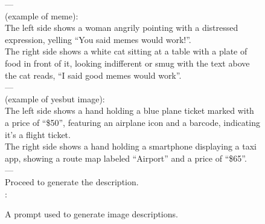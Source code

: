 \begin{figure*}[h]
\begin{tcolorbox}
---\\
\text{[Description]} (example of meme):\\
The left side shows a woman angrily pointing with a distressed expression, yelling ``You said memes would work!''.\\
The right side shows a white cat sitting at a table with a plate of food in front of it, looking indifferent or smug with the text above the cat reads, ``I said good memes would work''.\\
---\\
\text{[Description]} (example of yesbut image):\\
The left side shows a hand holding a blue plane ticket marked with a price of ``\$50'', featuring an airplane icon and a barcode, indicating it's a flight ticket.\\
The right side shows a hand holding a smartphone displaying a taxi app, showing a route map labeled ``Airport'' and a price of ``\$65''.\\
---\\

Proceed to generate the description.\\
\text{[Description]}:

\end{tcolorbox}
\caption{A prompt used to generate image descriptions.} %
\label{fig:desc-prompt}
\end{figure*}


